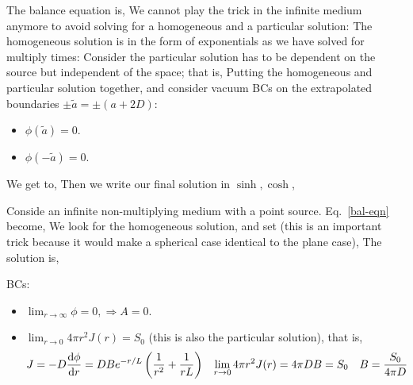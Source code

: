 \documentclass{school-22.211-notes}
\begin{document}
The balance equation is, 
We cannot play the trick in the infinite medium anymore to avoid solving for a homogeneous and a particular solution: 
The homogeneous solution is in the form of exponentials as we have solved for multiply times: 
Consider the particular solution has to be dependent on the source but independent of the space; that is, 
Putting the homogeneous and particular solution together, and consider vacuum BCs on the extrapolated boundaries $\pm \tilde{a} = \pm (a + 2D)$: 
\begin{itemize}
\item $\phi(\tilde{a}) = 0$. 
\item $\phi(-\tilde{a}) = 0$. 
\end{itemize}
We get to, 
Then we write our final solution in $\sinh, \cosh$, 


\clearpage
{}
Conside an infinite non-multiplying medium with a point source. Eq.~\ref{bal-eqn} become,
We look for the homogeneous solution, and set  (this is an important trick because it would make a spherical case identical to the plane case), 
The solution is, 

BCs: 
\begin{itemize}
\item $\displaystyle \lim_{r\to \infty} \phi = 0, \Rightarrow A=0$.
\item $\displaystyle  \lim_{r\to 0} 4 \pi r^2 J(r) = S_0$ (this is also the particular solution), that is, 
\begin{align}
J &= -D \frac{\mathrm{d}\phi}{\mathrm{d}r} = DBe^{-r/L} \left( \frac{1}{r^2} + \frac{1}{rL} \right)
&\lim_{r\to 0} 4 \pi r^2 J(r) &= 4 \pi DB = S_0 &B &= \frac{S_0}{4 \pi D}
\end{align}
\end{itemize}
\end{document}
